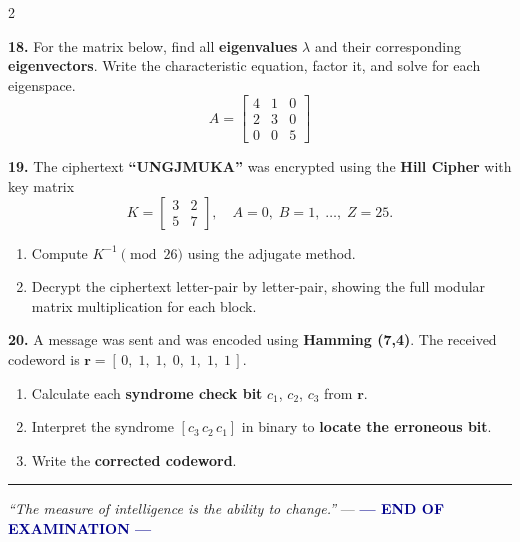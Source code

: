 \documentclass[a4paper,10pt]{article}
\begin{document}
\begin{multicols}{2}
    \medskip

    \textbf{18.} For the matrix below, find all \textbf{eigenvalues} $\lambda$ and their corresponding \textbf{eigenvectors}. Write the characteristic equation, factor it, and solve for each eigenspace.
    \[
        A = \begin{bmatrix} 4 & 1 & 0 \\ 2 & 3 & 0 \\ 0 & 0 & 5 \end{bmatrix}
    \]

    \medskip

    \textbf{19.} The ciphertext \textbf{``UNGJMUKA''} was encrypted using the \textbf{Hill Cipher} with key matrix
    \[
        K = \begin{bmatrix} 3 & 2 \\ 5 & 7 \end{bmatrix}, \quad A=0,\;B=1,\;\ldots,\;Z=25.
    \]
    \begin{enumerate}[label=(\alph*)]
        \item Compute $K^{-1}\pmod{26}$ using the adjugate method.
        \item Decrypt the ciphertext letter-pair by letter-pair, showing the full modular matrix multiplication for each block.
    \end{enumerate}

    \medskip

    \textbf{20.}  A message was sent and was encoded using \textbf{Hamming (7,4)}. The received codeword is $\mathbf{r}=[\,0,\;1,\;1,\;0,\;1,\;1,\;1\,]$.
    \begin{enumerate}[label=(\alph*)]
        \item Calculate each \textbf{syndrome check bit} $c_1$, $c_2$, $c_3$ from $\mathbf{r}$.
        \item Interpret the syndrome $[c_3\,c_2\,c_1]$ in binary to \textbf{locate the erroneous bit}.
        \item Write the \textbf{corrected codeword}.
    \end{enumerate}

\end{multicols}

\vspace{5pt}
\noindent\textcolor{darkblue}{\rule{\linewidth}{1.2pt}}
\begin{center}
    \small\textit{``The measure of intelligence is the ability to change.''} ---
    \textcolor{darkblue}{\textbf{--- END OF EXAMINATION ---}}
\end{center}
\end{document}
